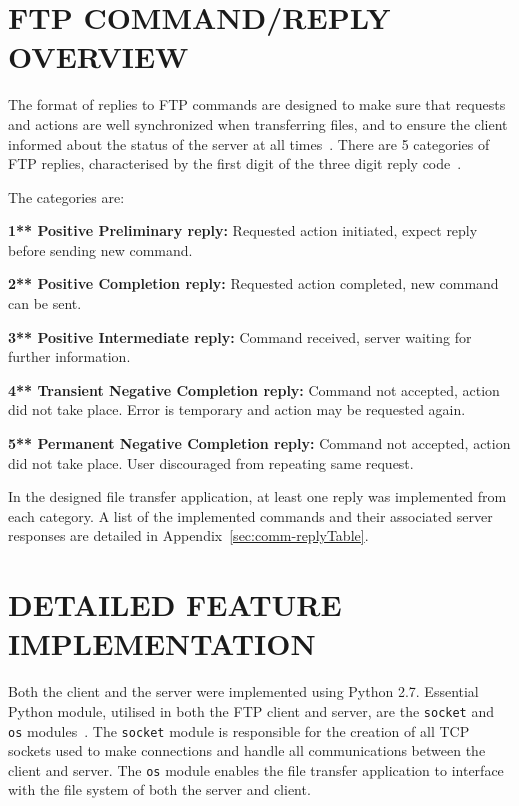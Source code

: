 \documentclass[10pt,twocolumn]{witseiepaper}
\begin{document}
\section{FTP COMMAND/REPLY OVERVIEW}\label{sec:command/reply}

The format of replies to FTP commands are designed to make sure that requests and actions are well synchronized when transferring files, and to ensure the client informed about the status of the server at all times~\cite{rfc959}. There are 5 categories of FTP replies, characterised by the first digit of the three digit reply code~\cite{rfc959}. 

The categories are: 

\textbf{1**	Positive Preliminary reply:} 
Requested action initiated, expect reply before sending new command.

\textbf{2**	Positive Completion reply:} 
Requested action completed, new command can be sent.

\textbf{3**   Positive Intermediate reply:} 
Command received, server waiting for further information.

\textbf{4**   Transient Negative Completion reply:} 
Command not accepted, action did not take place. Error is temporary and action may be requested again.

\textbf{5**   Permanent Negative Completion reply:} 
Command not accepted, action did not take place. User discouraged from repeating same request.

In the designed file transfer application, at least one reply was implemented from each category. A list of the implemented commands and their associated server responses are detailed in Appendix~\ref{sec:comm-replyTable}.

\section{DETAILED FEATURE IMPLEMENTATION} %

Both the client and the server were implemented using Python 2.7. Essential Python module, utilised in both the FTP client and server, are the \texttt{socket} and \texttt{os} modules~\cite{osModule,socketModule}. The \texttt{socket} module is responsible for the creation of all TCP sockets used to make connections and handle all communications between the client and server. The \texttt{os} module enables the file transfer application to interface with the file system of both the server and client.
\end{document}
